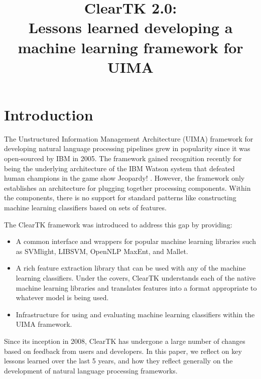\documentclass[10pt, a4paper]{article}
\title{ClearTK 2.0:\\ Lessons learned developing a machine learning framework for UIMA}
\begin{document}
\maketitleabstract

\section{Introduction}
The Unstructured Information Management Architecture (UIMA) framework for developing natural language processing pipelines grew in popularity since it was open-sourced by IBM in 2005.
The framework gained recognition recently for being the underlying architecture of the IBM Watson system that defeated human champions in the game show Jeopardy! \cite{ferrucci_building_2010}.
However, the framework only establishes an architecture for plugging together processing components.
Within the components, there is no support for standard patterns like constructing machine learning classifiers based on sets of features.

The ClearTK framework was introduced to address this gap \cite{ogren-etal:2008:UIMA-LREC,ogren-etal:2009:UIMA-GSCL} by providing:
\begin{itemize}
\item A common interface and wrappers for popular machine learning libraries such as SVMlight, LIBSVM, OpenNLP MaxEnt, and Mallet.
\item A rich feature extraction library that can be used with any of the machine learning classifiers. Under the covers, ClearTK understands each of the native machine learning libraries and translates features into a format appropriate to whatever model is being used.
\item Infrastructure for using and evaluating machine learning classifiers within the UIMA framework.
\end{itemize}

Since its inception in 2008, ClearTK has undergone a large number of changes based on feedback from users and developers.
In this paper, we reflect on key lessons learned over the last 5 years, and how they reflect generally on the development of natural language processing frameworks.
\end{document}

